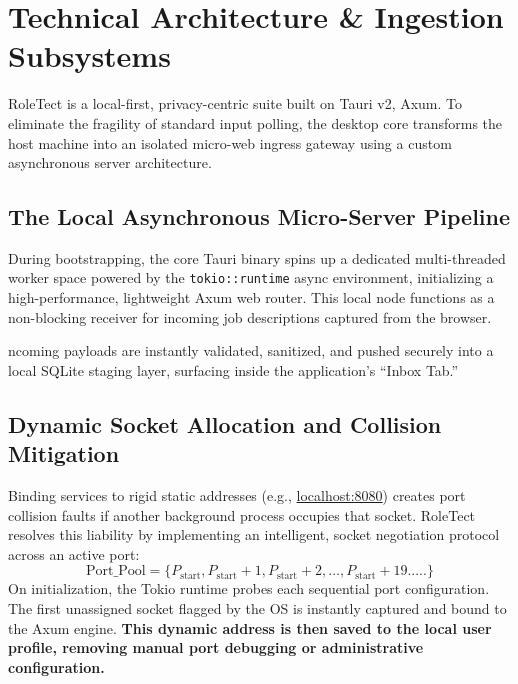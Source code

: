 \documentclass[10pt,a4paper]{article}
\begin{document}
\vspace*{0.5cm}




















\section{Technical Architecture \& Ingestion Subsystems}
RoleTect is a local-first, privacy-centric suite built on Tauri v2, Axum. To eliminate the fragility of standard input polling, the desktop core transforms the host machine into an isolated micro-web ingress gateway using a custom asynchronous server architecture.

\subsection{The Local Asynchronous Micro-Server Pipeline}
During bootstrapping, the core Tauri binary spins up a dedicated multi-threaded worker space powered by the \texttt{tokio::runtime} async environment, initializing a high-performance, lightweight Axum web router. This local node functions as a non-blocking receiver for incoming job descriptions captured from the browser.

 ncoming payloads are instantly validated, sanitized, and pushed securely into a local SQLite staging layer, surfacing inside the application's ``Inbox Tab.''

\subsection{Dynamic Socket Allocation and Collision Mitigation}
Binding services to rigid static addresses (e.g., \url{localhost:8080}) creates port collision faults if another background process occupies that socket. RoleTect resolves this liability by implementing an intelligent, socket negotiation protocol across an active port:
\begin{equation}
\text{Port\_Pool} = \{ P_{\text{start}}, P_{\text{start}} + 1, P_{\text{start}} + 2, \dots, P_{\text{start}} + 19..... \}
\end{equation}
On initialization, the Tokio runtime probes each sequential port configuration. The first unassigned socket flagged by the OS is instantly captured and bound to the Axum engine. \textbf{This dynamic address is then saved to the local user profile, removing manual port debugging or administrative configuration.}
\end{document}
